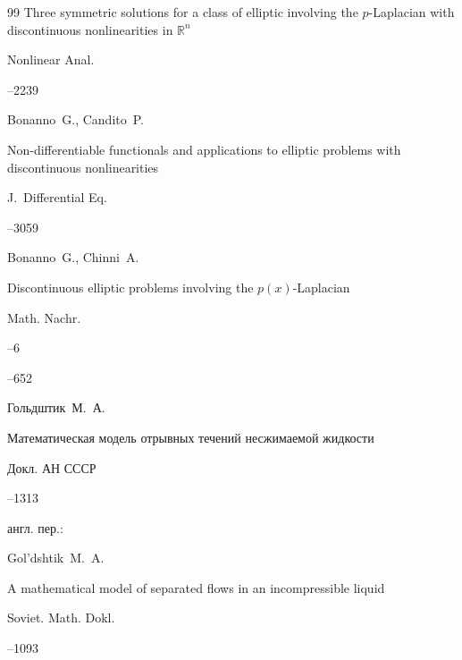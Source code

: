 \begin{thebibliography}{99}
\paper Three symmetric solutions for a class of  elliptic involving the $p$-Laplacian with discontinuous nonlinearities in  $\mathbb R^n$

\jour Nonlinear Anal.




--2239




\by  Bonanno~G., Candito~P.

\paper Non-differentiable functionals and applications  to elliptic problems with discontinuous nonlinearities

\jour J.~Differential Eq.




--3059




\by Bonanno~G., Chinni~A.

\paper Discontinuous elliptic problems involving the   $p(x)$-Laplacian

\jour Math. Nachr.



--6

--652




\by Гольдштик~М.~А.

\paper Математическая модель отрывных течений несжимаемой  жидкости

\jour Докл. АН СССР




--1313

\transl  англ. пер.:~

\by Gol'dshtik~M.~A.

\paper A mathematical model of separated flows  in an incompressible liquid

\jour Soviet. Math. Dokl.



--1093






\end{thebibliography}
